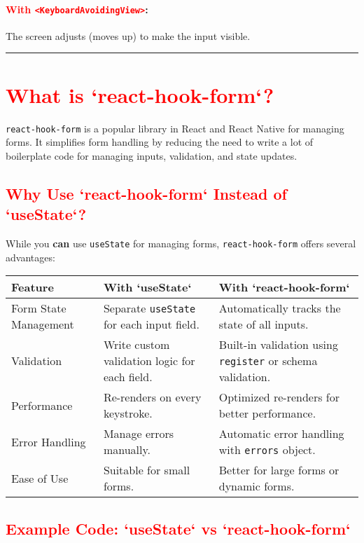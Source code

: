 \documentclass[12pt]{article}
\begin{document}
\paragraph{\textcolor{red}{With \texttt{<KeyboardAvoidingView>}}:}  
The screen adjusts (moves up) to make the input visible.

\hrule
\vspace{0.5em}

\section*{\textcolor{red}{\textbf{What is `react-hook-form`?}}}

\texttt{react-hook-form} is a popular library in React and React Native for managing forms. It simplifies form handling by reducing the need to write a lot of boilerplate code for managing inputs, validation, and state updates.

\subsection*{\textcolor{red}{Why Use `react-hook-form` Instead of `useState`?}}

While you \textbf{can} use \texttt{useState} for managing forms, \texttt{react-hook-form} offers several advantages:

\begin{tabular}{|p{3.5cm}|p{4.5cm}|p{4.5cm}|}
\hline
\textbf{Feature} & \textbf{With `useState`} & \textbf{With `react-hook-form`} \\
\hline
Form State Management & Separate \texttt{useState} for each input field. & Automatically tracks the state of all inputs. \\
\hline
Validation & Write custom validation logic for each field. & Built-in validation using \texttt{register} or schema validation. \\
\hline
Performance & Re-renders on every keystroke. & Optimized re-renders for better performance. \\
\hline
Error Handling & Manage errors manually. & Automatic error handling with \texttt{errors} object. \\
\hline
Ease of Use & Suitable for small forms. & Better for large forms or dynamic forms. \\
\hline
\end{tabular}

\vspace{0.5em}

\subsection*{\textcolor{red}{Example Code: `useState` vs `react-hook-form`}}
\end{document}
